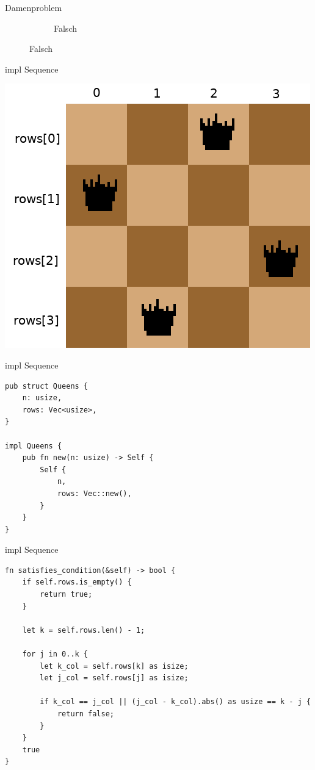 \documentclass[aspectratio=43,t]{beamer}
\begin{document}
\begin{frame}{Damenproblem}
\begin{figure}[h!]
\begin{subfigure}{0.4\linewidth}
          \caption{Falsch}
        \end{subfigure}
        \label{n4}
      \end{figure}
    \end{frame}
    \begin{frame}{impl Sequence}
      \begin{center}
        \includegraphics[width=\textwidth,height=0.8\textheight,keepaspectratio]{../img/q4.png}
      \end{center}
    \end{frame}
    \begin{frame}[fragile]{impl Sequence}
      \begin{verbatim}
pub struct Queens {
    n: usize,
    rows: Vec<usize>,
}

impl Queens {
    pub fn new(n: usize) -> Self {
        Self {
            n,
            rows: Vec::new(),
        }
    }
}
      \end{verbatim}
    \end{frame}
    \begin{frame}[fragile]{impl Sequence}
\begin{verbatim}
fn satisfies_condition(&self) -> bool {
    if self.rows.is_empty() {
        return true;
    }

    let k = self.rows.len() - 1;

    for j in 0..k {
        let k_col = self.rows[k] as isize;
        let j_col = self.rows[j] as isize;

        if k_col == j_col || (j_col - k_col).abs() as usize == k - j {
            return false;
        }
    }
    true
}
\end{verbatim}
    \end{frame}
\end{document}

